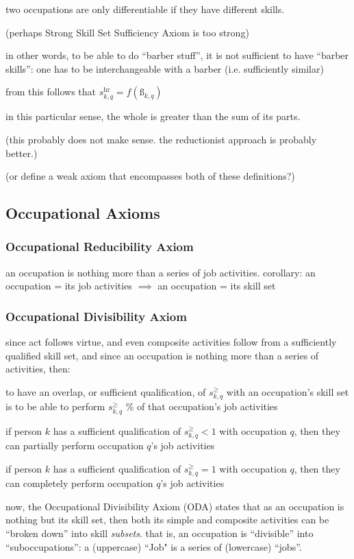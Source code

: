 \documentclass{elsarticle} %
\begin{document}
two occupations are only differentiable if they have different skills.

(perhaps Strong Skill Set Sufficiency Axiom is too strong)

in other words, to be able to do ``barber stuff'', it is not sufficient to have
``barber skills'': one has to be interchangeable with a barber (i.e.
sufficiently similar)

from this follows that $s_{k,q}^{\text{hr}} = f(\textit{\ss}_{k,q})$

in this particular sense, the whole is greater than the sum of its parts.

(this probably does not make sense. the reductionist approach is probably better.)

(or define a weak axiom that encompasses both of these definitions?)

\subsection{Occupational Axioms}
\subsubsection{Occupational Reducibility Axiom}
an occupation is nothing more than a series of job activities. corollary: an
occupation = its job activities $\implies$ an occupation = its skill set

\subsubsection{Occupational Divisibility Axiom}
since act follows virtue, and even composite activities follow from a
sufficiently qualified skill set, and since an occupation is nothing more than
a series of activities, then:

to have an overlap, or sufficient qualification, of $s_{k,q}^{\geq}$ with an
occupation's skill set is to be able to perform $s_{k,q}^{\geq}$ \% of that
occupation's job activities

if person $k$ has a sufficient qualification of $s_{k,q}^{\geq} < 1$ with
occupation $q$, then they can partially perform occupation $q$'s job activities

if person $k$ has a sufficient qualification of $s_{k,q}^{\geq} = 1$ with
occupation $q$, then they can completely perform occupation $q$'s job
activities

now, the Occupational Divisibility Axiom (ODA) states that as an occupation is
nothing but its skill set, then both its simple and composite activities can be
``broken down'' into skill \textit{subsets}. that is, an occupation is
``divisible'' into ``suboccupations'': a (uppercase) ``Job" is a series of
(lowercase) ``jobs''.
\end{document}
